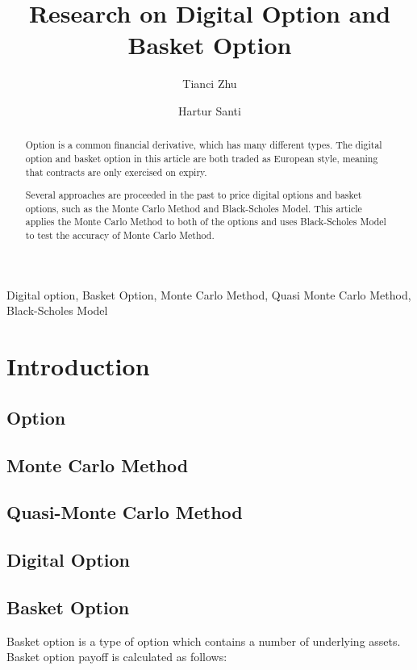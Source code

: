 \documentclass[]{elsarticle}
\theoremstyle{definition}
\theoremstyle{remark}
\begin{document}
\begin{frontmatter}
\title{Research on Digital Option and Basket Option}
\author{Tianci Zhu}
\author{Hartur Santi}
\address{Department of Applied Mathematics, Illinois Institute of Technology, Illinois, USA}

\begin{abstract}
Option is a common financial derivative, which has many different types. The digital option and basket option in this article are both traded as European style, meaning that contracts are only exercised on expiry.

Several approaches are proceeded in the past to price digital options and basket options, such as the Monte Carlo Method and Black-Scholes Model. This article applies the Monte Carlo Method to both of the options and uses Black-Scholes Model to test the accuracy of Monte Carlo Method.
\end{abstract}

\begin{keyword}
Digital option, Basket Option, Monte Carlo Method, Quasi Monte Carlo Method, Black-Scholes Model
\end{keyword}
\end{frontmatter}

\section{Introduction}
\subsection{Option}

\subsection{Monte Carlo Method}

\subsection{Quasi-Monte Carlo Method}

\subsection{Digital Option}

\subsection{Basket Option}
Basket option is a type of option  which contains a number of underlying assets. Basket option payoff is calculated as follows:
\end{document}
